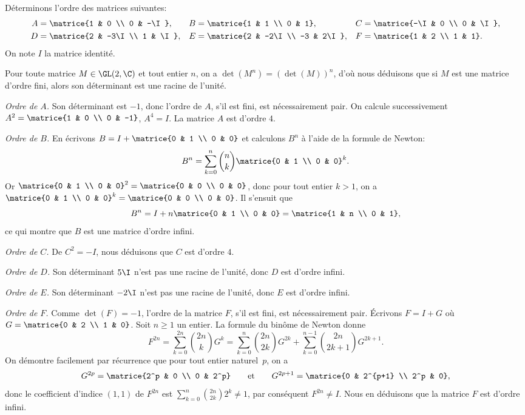 Déterminons l'ordre des matrices suivantes:
%
\begin{align*}
  A &= \matrice{1 & 0 \\ 0 & -\I}, & B &= \matrice{1 & 1 \\ 0 & 1}, & C &= \matrice{-\I & 0 \\ 0 & \I}, \\
  D &= \matrice{2 & -3\I \\ 1 & \I}, & E &= \matrice{2 & -2\I \\ -3 & 2\I}, & F &=\matrice{1 & 2 \\ 1 & 1}.
\end{align*}
%
On note $I$ la matrice identité.

Pour toute matrice $M\in\GL(2,\C)$ et tout entier $n$, on a $\det(M^n) = (\det(M))^n$, d'où nous déduisons que si $M$ est une matrice d'ordre fini, alors son déterminant est une racine de l'unité.

\emph{Ordre de $A$.}
Son déterminant est $-1$, donc l'ordre de $A$, s'il est fini, est nécessairement pair.
On calcule successivement $A^2 = \matrice{1 & 0 \\ 0 & -1}$, $A^4 = I$.
La matrice $A$ est d'ordre $4$.

\emph{Ordre de $B$.}
En écrivons $B = I + \matrice{0 & 1 \\ 0 & 0}$ et calculons $B^n$ à l'aide de la formule de Newton:
\[
  B^n = \sum_{k = 0}^n \binom{n}{k} \matrice{0 & 1 \\ 0 & 0}^k.
\]
Or $\matrice{0 & 1 \\ 0 & 0}^2 = \matrice{0 & 0 \\ 0 & 0}$, donc pour tout entier $k>1$, on a $\matrice{0 & 1 \\ 0 & 0}^k = \matrice{0 & 0 \\ 0 & 0}$.
Il s'ensuit que
\[
  B^n = I + n\matrice{0 & 1 \\ 0 & 0} = \matrice{1 & n \\ 0 & 1},
\]
ce qui montre que $B$ est une matrice d'ordre infini.

\emph{Ordre de $C$.}
De $C^2 = -I$, nous déduisons que $C$ est d'ordre $4$.

\emph{Ordre de $D$.}
Son déterminant $5\I$ n'est pas une racine de l'unité, donc $D$ est d'ordre infini.

\emph{Ordre de $E$.}
Son déterminant $-2\I$ n'est pas une racine de l'unité, donc $E$ est d'ordre infini.

\emph{Ordre de $F$.}
Comme $\det(F) = -1$, l'ordre de la matrice $F$, s'il est fini, est nécessairement pair.
Écrivons $F = I + G$ où $G = \matrice{0 & 2 \\ 1 & 0}$.
Soit $n\geq 1$ un entier.
La formule du binôme de Newton donne
%
\[
  F^{2n}
    = \sum_{k=0}^{2n} \binom{2n}{k} G^k
    = \sum_{k=0}^n \binom{2n}{2k} G^{2k} + \sum_{k=0}^{n-1} \binom{2n}{2k+1} G^{2k+1}.
\]
On démontre facilement par récurrence que pour tout entier naturel~$p$, on a
\[
  G^{2p} = \matrice{2^p & 0 \\ 0 & 2^p}
  \qquad\text{et}\qquad
  G^{2p+1} = \matrice{0 & 2^{p+1} \\ 2^p & 0},
\]
donc le coefficient d'indice $(1,1)$ de $F^{2n}$ est $\sum_{k=0}^n \binom{2n}{2k} 2^k \neq 1$, par conséquent $F^{2n} \neq I$.
Nous en déduisons que la matrice $F$ est d'ordre infini.

